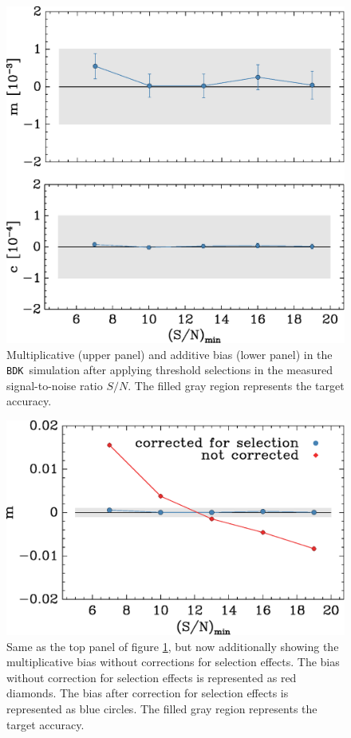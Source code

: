 \documentclass[iop, twocolappendix, appendixfloats, numberedappendix, apj]{emulateapj}
\newcommand{\snr}{$S/N$}
\newcommand{\bdksim}{\texttt{BDK}}
\begin{document}
\begin{figure}[h]
    \centering
    \includegraphics[width=\columnwidth]{mc-select-bias-thresh.eps}

    \caption{Multiplicative (upper panel) and
		additive bias (lower panel) in the \bdksim\ simulation after applying
        threshold selections in the measured signal-to-noise ratio \snr.   
        The filled gray region represents the target accuracy. } 

\label{fig:s2nthresh}
\end{figure}


\begin{figure}[h]
    \centering
    \includegraphics[width=\columnwidth]{mc-select-bias-thresh-with-nocorr.eps}

	\caption{Same as the top panel of figure \ref{fig:s2nthresh}, but now
additionally showing the multiplicative bias without corrections for selection
effects.  The bias without correction for selection effects is represented as
red diamonds. The bias after correction for selection effects is represented as
blue circles.  The filled gray region represents the target accuracy. } 

\label{fig:s2nthresh_nocorr}
\end{figure}
\end{document}
